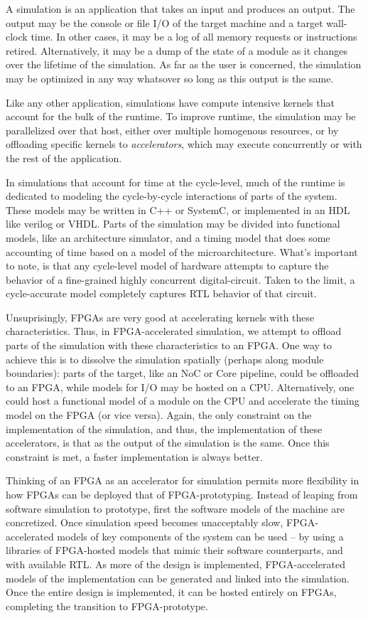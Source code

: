 A simulation is an application that takes an input and produces an output.  The
output may be the console or file I/O of the target machine and a target
wall-clock time. In other cases, it may be a log of all memory requests or
instructions retired. Alternatively, it may be a dump of the state of a module
as it changes over the lifetime of the simulation.  As far as the user is
concerned, the simulation may be optimized in any way whatsover so long as this
output is the same.

Like any other application, simulations have compute intensive kernels that
account for the bulk of the runtime. To improve runtime, the simulation may be
parallelized over that host, either over multiple homogenous resources, or by
offloading specific kernels to \emph{accelerators}, which may execute
concurrently or with the rest of the application.

In simulations that account for time at the cycle-level, much of the runtime is
dedicated to modeling the cycle-by-cycle interactions of parts of the system.
These models may be written in C++ or SystemC, or implemented in an HDL like
verilog or VHDL. Parts of the simulation may be divided into functional models,
like an architecture simulator, and a timing model that does some accounting of
time based on a model of the microarchitecture. What's important to note, is
that any cycle-level model of hardware attempts to capture the behavior of a
fine-grained highly concurrent digital-circuit. Taken to the limit, a
cycle-accurate model completely captures RTL behavior of that circuit.

Unsuprisingly, FPGAs are very good at accelerating kernels with these
characteristics. Thus, in FPGA-accelerated simulation, we attempt to offload
parts of the simulation with these characteristics to an FPGA. One way to
achieve this is to dissolve the simulation spatially (perhaps along module
boundaries): parts of the target, like an NoC or Core pipeline, could be
offloaded to an FPGA, while models for I/O may be hosted on a CPU.
Alternatively, one could host a functional model of a module on the CPU and
accelerate the timing model on the FPGA (or vice versa).  Again, the only
constraint on the implementation of the simulation, and thus, the
implementation of these accelerators, is that as the output of the simulation
is the same. Once this constraint is met, a faster implementation is always better.

Thinking of an FPGA as an accelerator for simulation permits more flexibility
in how FPGAs can be deployed that of FPGA-prototyping. Instead of leaping from
software simulation to prototype, first the software models of the machine are
concretized. Once simulation speed becomes unacceptably slow, FPGA-accelerated
models of key components of the system can be used -- by using a libraries of
FPGA-hosted models that mimic their software counterparts, and with available
RTL. As more of the design is implemented, FPGA-accelerated models of the
implementation can be generated and linked into the simulation. Once the entire
design is implemented, it can be hosted entirely on FPGAs, completing the
transition to FPGA-prototype.

